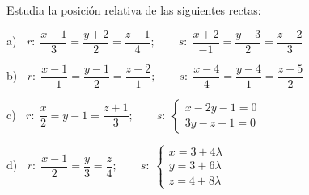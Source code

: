 \begin{ejre}
	Estudia la posición relativa de las siguientes rectas:
	
	a) $\;\;r:\;\dfrac{x-1}{3}=\dfrac{y+2}{2}=\dfrac{z-1}{4}; \qquad s:\;\dfrac{x+2}{-1}=\dfrac{y-3}{2}=\dfrac{z-2}{3}$
	
	b) $\;\;r:\;\dfrac{x-1}{-1}=\dfrac{y-1}{2}=\dfrac{z-2}{1}; \qquad s:\;\dfrac{x-4}{4}=\dfrac{y-4}{1}=\dfrac{z-5}{2}$
	
	c) $\;\;r:\;\dfrac{x}{2}=y-1=\dfrac{z+1}{3}; \qquad s:\;\begin{cases} x-2y-1=0\\3y-z+1=0 \end{cases}$
	
	d) $\;\;r:\;\dfrac{x-1}{2}=\dfrac{y}{3}=\dfrac{z}{4}; \qquad s:\;\begin{cases} x=3+4\lambda \\ y=3+6\lambda \\z=4+8\lambda \end{cases}$
\end{ejre}

